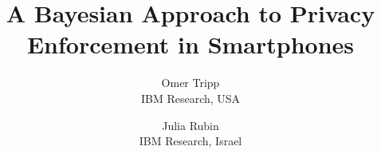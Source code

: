 \documentclass[letterpaper,twocolumn,10pt]{article}
\begin{document}
\date{}


\title{A Bayesian Approach to Privacy Enforcement in Smartphones}
\author{
{\rm Omer Tripp}\\
IBM Research, USA
\and
{\rm Julia Rubin}\\
IBM Research, Israel
} %

\maketitle



















\balance

\appendix

%

\end{document}
